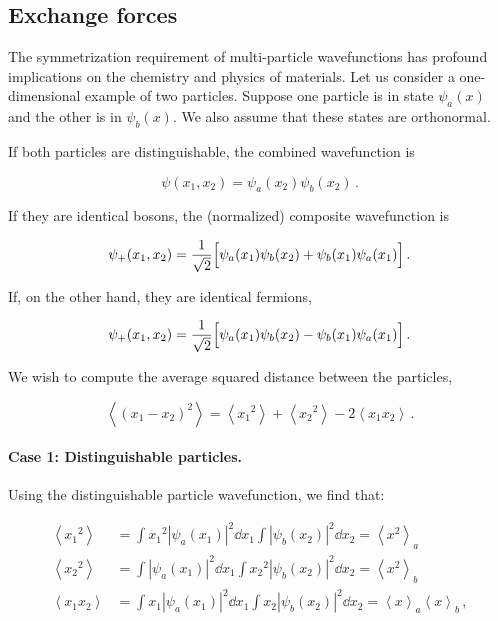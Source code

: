 \documentclass[12pt, titlepage]{article}
\newcommand{\exv}[1]{\left\langle #1 \right\rangle}
\begin{document}
\subsection{Exchange forces}
The symmetrization requirement of multi-particle wavefunctions has profound implications on the chemistry and physics of materials. Let us consider a one-dimensional example of two particles. Suppose one particle is in state $\psi_a(x)$ and the other is in $\psi_b(x)$. We also assume that these states are orthonormal.

If both particles are distinguishable, the combined wavefunction is

\begin{equation}
	\psi(x_1,x_2) = \psi_a(x_2)\psi_b(x_2) \,.
\end{equation}

If they are identical bosons, the (normalized) composite wavefunction is

\begin{equation}
	\psi_+(x_1,x_2) = \frac{1}{\sqrt{2}}\Bigl[\psi_a(x_1)\psi_b(x_2) + \psi_b(x_1)\psi_a(x_1)\Bigr] \,.
\end{equation}

If, on the other hand, they are identical fermions,

\begin{equation}
\psi_+(x_1,x_2) = \frac{1}{\sqrt{2}}\Bigl[\psi_a(x_1)\psi_b(x_2) - \psi_b(x_1)\psi_a(x_1)\Bigr] \,.
\end{equation}

We wish to compute the average squared distance between the particles,

\begin{equation}
	\exv{(x_1-x_2)^2} = \exv{{x_1}^2} + \exv{{x_2}^2} - 2\exv{x_1x_2} \,.
\end{equation}

\paragraph*{Case 1: Distinguishable particles.} Using the distinguishable particle wavefunction, we find that:

\begin{align*}
	\exv{{x_1}^2} &= \int{x_1}^2|\psi_a(x_1)|^2 \dd{x_1}\int|\psi_b(x_2)|^2\dd{x_2} = \exv{x^2}_a \\[4pt]
	\exv{{x_2}^2} &= \int|\psi_a(x_1)|^2\dd{x_1}\int{x_2}^2|\psi_b(x_2)|^2 \dd{x_2} = \exv{x^2}_b \\[4pt]
	\exv{x_1x_2} &= \int x_1|\psi_a(x_1)|^2 \dd{x_1} \int x_2|\psi_b(x_2)|^2\dd{x_2} = \exv{x}_a\exv{x}_b \,,
\end{align*}
\end{document}
